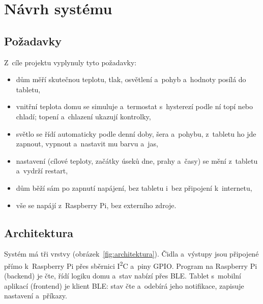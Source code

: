 \chapter{Návrh systému}
\label{chap:navrh}

\section{Požadavky}

Z~cíle projektu vyplynuly tyto požadavky:
\begin{itemize}
  \item dům měří skutečnou teplotu, tlak, osvětlení a~pohyb a~hodnoty posílá do tabletu,
  \item vnitřní teplota domu se simuluje a~termostat s~hysterezí podle ní topí nebo chladí;
        topení a~chlazení ukazují kontrolky,
  \item světlo se řídí automaticky podle denní doby, šera a~pohybu, z~tabletu ho jde zapnout,
        vypnout a~nastavit mu barvu a~jas,
  \item nastavení (cílové teploty, začátky úseků dne, prahy a~časy) se mění z~tabletu a~vydrží
        restart,
  \item dům běží sám po zapnutí napájení, bez tabletu i~bez připojení k~internetu,
  \item vše se napájí z~Raspberry Pi, bez externího zdroje.
\end{itemize}

\section{Architektura}

Systém má tři vrstvy (obrázek~\ref{fig:architektura}). Čidla a~výstupy jsou připojené přímo
k~Raspberry Pi přes sběrnici I\textsuperscript{2}C a~piny GPIO. Program na Raspberry Pi
(backend) je čte, řídí logiku domu a~stav nabízí přes BLE. Tablet s~mobilní aplikací
(frontend) je klient BLE: stav čte a~odebírá jeho notifikace, zapisuje nastavení a~příkazy.

